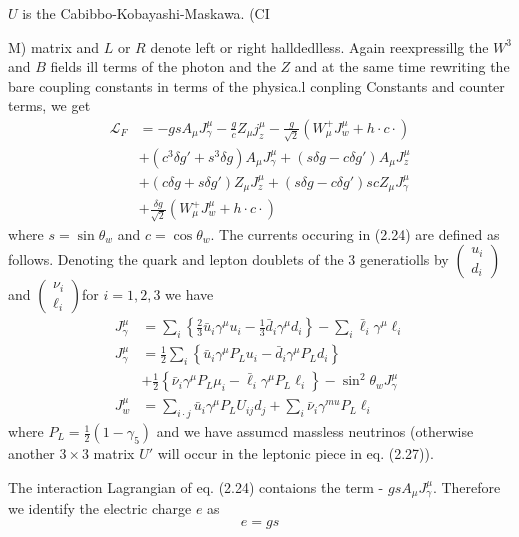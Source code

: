 $U$ is the Cabibbo-Kobayashi-Maskawa. (CI{M) matrix and $L$ or $R$ denote left
or right halldedlless. Again reexpressillg the $W^{3}$ and $B$ fields ill terms of the
photon and the $Z$ and at the same time rewriting the bare coupling constants
in terms of the physica.l conpling Constants and counter terms, we get 
\begin{align*}
\mathcal{L}_{F} &= -gs A_{\mu} J_{\gamma}^{\mu}- \frac{g}{c}Z_{\mu} j_{z}^{\mu} - \frac{g}{\sqrt{2}} (W_{\mu}^{+} J_{w}^{\mu} + h \cdot c \cdot)\\
& + (c^{3} \delta g' + s^{3} \delta g)A_{\mu} J_{\gamma}^{\mu}+ (s \delta g - c\delta g') A_{\mu} J_{z}^{\mu}\\
&+ (c \delta g +s \delta g') Z_{\mu} J_{z}^{\mu} + (s \delta g- c\delta g')scZ_{\mu} J_{\gamma}^{\mu}\tag{2.24}\\
& + \frac{\delta g}{\sqrt{2}}(W_{\mu}^{+} J_{w}^{\mu} + h \cdot c \cdot) 
\end{align*}
where $s = \sin \theta_{w}$ and $c = \cos \theta_{w}$. The currents occuring in (2.24) are defined as
follows. Denoting the quark and lepton doublets of the 3 generatiolls by $\begin{pmatrix}u_{i}\\
d_{i} \end{pmatrix}$ and $\begin{pmatrix}\nu_{i}\\
\ell_{i} \end{pmatrix}$for $i=1,2,3$ we have
\begin{align*}
J_{\gamma}^{\mu} &= \sum_{i}\left\{\frac{2}{3} \bar{u}_{i} \gamma^{\mu} u_{i} - \frac{1}{3} \bar{d}_{i} \gamma^{\mu} d_{i} \right\} - \sum_{i} \bar{\ell}_{i}\gamma^{\mu} \ell_{i}\tag{2.25}\\
J_{\gamma}^{\mu} &=\frac{1}{2} \sum_{i} \left\{\bar{u}_{i}\gamma^{\mu}P_{L}u_{i}-\bar{d}_{i}\gamma^{\mu} P_{L}d_{i}\right\}\\
&+\frac{1}{2}\left\{\bar{\nu}_{i} \gamma^{\mu} P_{L}\mu_{i} - \bar{\ell}_{i} \gamma^{\mu}P_{L} \ell_{i} \right\}- \sin^{2}\theta_{w}J_{\gamma}^{\mu}\tag{2.26}\\
J_{w}^{\mu} &=\sum_{i \cdot j}\bar{u}_{i}\gamma^{\mu} P_{L}U_{ij}d_{j}+ \sum_{i}\bar{\nu}_{i} \gamma^{mu}P_{L}\ell_{i}\tag{2.27}
\end{align*}
where $P_{L}=\frac{1}{2}(1- \gamma_{5})$ and we have assumcd massless neutrinos (otherwise
another $3 \times 3$ matrix $U'$ will occur in the leptonic piece in eq. (2.27)). 

The interaction Lagrangian of eq. (2.24) contaions the term - $g s A_{\mu} J_{\gamma}^{\mu}$.
Therefore we identify the electric charge $e$ as 
\begin{equation*}
e =g s\tag{2.28}
\end{equation*}

}
